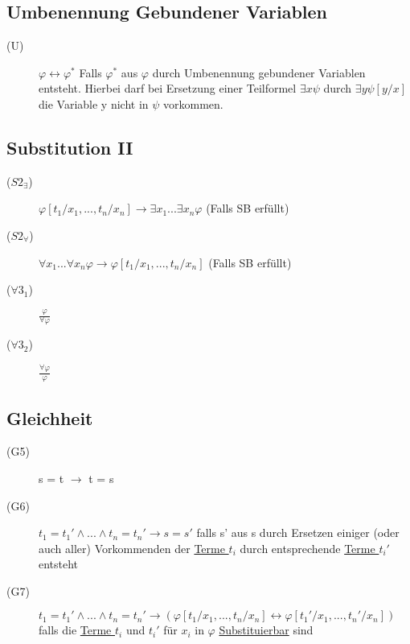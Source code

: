 \documentclass[12pt,a4paper]{article} %
\begin{document}
	\subsection{Umbenennung Gebundener Variablen}
	\begin{description}
		\item[(U)] $\varphi \leftrightarrow \varphi^*$ \newline
		Falls $\varphi^*$ aus $\varphi$ durch Umbenennung gebundener Variablen entsteht. Hierbei darf bei Ersetzung einer Teilformel $\exists x \psi$ durch $\exists y \psi[y/x]$ die Variable y nicht in $\psi$ vorkommen.
	\end{description}

	\subsection{Substitution II}
	\begin{description}
		\item[($S2_{\exists}$)] $\varphi[t_1/x_1, ..., t_n/x_n] \rightarrow \exists x_1 ... \exists x_n \varphi$ (Falls SB erfüllt)
		\item[($S2_{\forall}$)] $\forall x_1 ... \forall x_n \varphi \rightarrow \varphi[t_1/x_1, ..., t_n/x_n]$ (Falls SB erfüllt)
		\item[($\forall 3_1$)] $\frac{\varphi}{\forall \varphi}$
		\item[($\forall 3_2$)] $\frac{\forall \varphi}{\varphi}$
	\end{description}

	\subsection{Gleichheit}
	\begin{description}
		\item[(G5)] s = t $\rightarrow$ t = s
		\item[(G6)] $t_1 = t_1' \land ... \land t_n = t_n' \rightarrow s = s'$ \newline
		falls s' aus s durch Ersetzen einiger (oder auch aller) Vorkommenden der \hyperref[Term]{Terme $t_i$} durch entsprechende \hyperref[Term]{Terme $t_i'$} entsteht
		\item[(G7)] $t_1 = t_1' \land ... \land t_n = t_n' \rightarrow (\varphi[t_1/x_1, ..., t_n/x_n] \leftrightarrow \varphi[t_1'/x_1, ..., t_n'/x_n])$ \newline 
		falls die \hyperref[Term]{Terme $t_i$} und $t_i'$ für $x_i$ in $\varphi$ \hyperref[Substituierbar]{Substituierbar} sind
	\end{description}
\end{document}
